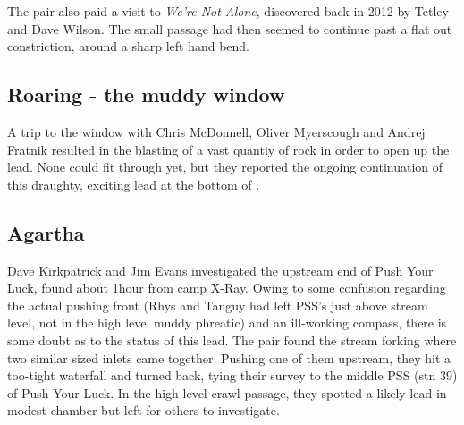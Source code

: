 The pair also paid a visit to \emph{We're Not Alone}, discovered back in 2012 by Tetley and Dave Wilson. The small passage had then seemed to continue past a flat out constriction, around a sharp left hand bend. 

\subsection{Roaring - the muddy window}
A trip to the  window with Chris McDonnell, Oliver Myerscough and Andrej Fratnik resulted in the blasting of a vast quantiy of rock in order to open up the lead. None could fit through yet, but they reported the ongoing continuation of this draughty, exciting lead at the bottom of .


\subsection{Agartha}
Dave Kirkpatrick and Jim Evans investigated the upstream end of Push Your Luck, found about 1hour from camp X-Ray. Owing to some confusion regarding the actual pushing front (Rhys and Tanguy had left PSS's just above stream level, not in the high level muddy phreatic) and an ill-working compass, there is some doubt as to the status of this lead. The pair found the stream forking where two similar sized inlets came together. Pushing one of them upstream, they hit a too-tight waterfall and turned back, tying their survey to the middle PSS (stn 39) of Push Your Luck. In the high level crawl passage, they spotted a likely lead in modest chamber but left for others to investigate.

